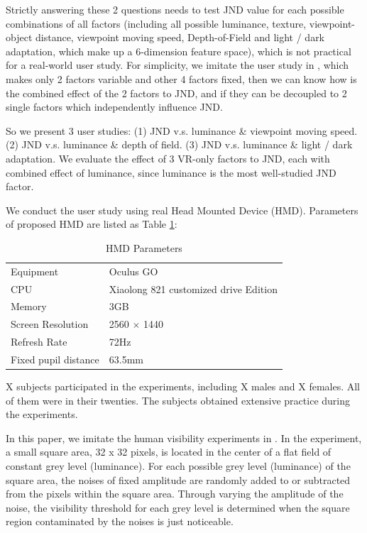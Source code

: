 Strictly answering these 2 questions needs to test JND value for each possible combinations of all factors (including all possible luminance, texture, viewpoint-object distance, viewpoint moving speed, Depth-of-Field and light / dark adaptation, which make up a 6-dimension feature space), which is not practical for a real-world user study. For simplicity, we imitate the user study in \cite{distance}, which makes only 2 factors variable and other 4 factors fixed, then we can know how is the combined effect of the 2 factors to JND, and if they can be decoupled to 2 single factors which independently influence JND.

So we present 3 user studies: (1) JND v.s. luminance \& viewpoint moving speed. (2) JND v.s. luminance \& depth of field. (3) JND v.s. luminance \& light / dark adaptation. We evaluate the effect of 3 VR-only factors to JND, each with combined effect of luminance, since luminance is the most well-studied JND factor.

We conduct the user study using real Head Mounted Device (HMD). Parameters of proposed HMD are listed as Table \ref{table1}:

\begin{table}[h]
\centering
\caption{HMD Parameters}\label{table1}
\begin{tabular}{|p{3.5cm}|p{3.5cm}|}
\hline
Equipment & Oculus GO\\
CPU & Xiaolong 821 customized drive Edition\\
Memory & 3GB\\
Screen Resolution & 2560 $\times$ 1440\\
Refresh Rate & 72Hz\\
Fixed pupil distance & 63.5mm\\
\hline
\end{tabular}
\end{table}

X subjects participated in the experiments, including X males and X females. All of them were in their twenties. The subjects obtained extensive practice during the experiments.

In this paper, we imitate the human visibility experiments in \cite{PSPNR}. In the experiment, a small square area, 32 x 32 pixels, is located in the center of a flat field of constant grey level (luminance). For each possible grey level (luminance) of the square area, the noises of fixed amplitude are randomly added to or subtracted from the pixels within the square area. Through varying the amplitude of the noise, the visibility threshold for each grey level is determined when the square region contaminated by the noises is just noticeable. 


